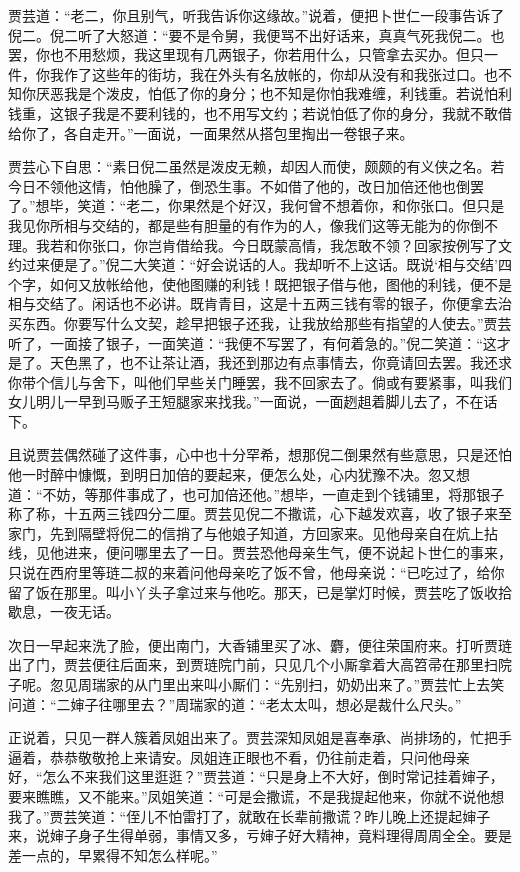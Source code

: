 \documentclass[12pt,oneside]{book}
\begin{document}
贾芸道：“老二，你且别气，听我告诉你这缘故。”说着，便把卜世仁一段事告诉了倪二。倪二听了大怒道：“要不是令舅，我便骂不出好话来，真真气死我倪二。也罢，你也不用愁烦，我这里现有几两银子，你若用什么，只管拿去买办。但只一件，你我作了这些年的街坊，我在外头有名放帐的，你却从没有和我张过口。也不知你厌恶我是个泼皮，怕低了你的身分；也不知是你怕我难缠，利钱重。若说怕利钱重，这银子我是不要利钱的，也不用写文约；若说怕低了你的身分，我就不敢借给你了，各自走开。”一面说，一面果然从搭包里掏出一卷银子来。

贾芸心下自思：“素日倪二虽然是泼皮无赖，却因人而使，颇颇的有义侠之名。若今日不领他这情，怕他臊了，倒恐生事。不如借了他的，改日加倍还他也倒罢了。”想毕，笑道：“老二，你果然是个好汉，我何曾不想着你，和你张口。但只是我见你所相与交结的，都是些有胆量的有作为的人，像我们这等无能为的你倒不理。我若和你张口，你岂肯借给我。今日既蒙高情，我怎敢不领？回家按例写了文约过来便是了。”倪二大笑道：“好会说话的人。我却听不上这话。既说‘相与交结’四个字，如何又放帐给他，使他图赚的利钱！既把银子借与他，图他的利钱，便不是相与交结了。闲话也不必讲。既肯青目，这是十五两三钱有零的银子，你便拿去治买东西。你要写什么文契，趁早把银子还我，让我放给那些有指望的人使去。”贾芸听了，一面接了银子，一面笑道：“我便不写罢了，有何着急的。”倪二笑道：“这才是了。天色黑了，也不让茶让酒，我还到那边有点事情去，你竟请回去罢。我还求你带个信儿与舍下，叫他们早些关门睡罢，我不回家去了。倘或有要紧事，叫我们女儿明儿一早到马贩子王短腿家来找我。”一面说，一面趔趄着脚儿去了，不在话下。

且说贾芸偶然碰了这件事，心中也十分罕希，想那倪二倒果然有些意思，只是还怕他一时醉中慷慨，到明日加倍的要起来，便怎么处，心内犹豫不决。忽又想道：“不妨，等那件事成了，也可加倍还他。”想毕，一直走到个钱铺里，将那银子称了称，十五两三钱四分二厘。贾芸见倪二不撒谎，心下越发欢喜，收了银子来至家门，先到隔壁将倪二的信捎了与他娘子知道，方回家来。见他母亲自在炕上拈线，见他进来，便问哪里去了一日。贾芸恐他母亲生气，便不说起卜世仁的事来，只说在西府里等琏二叔的来着问他母亲吃了饭不曾，他母亲说：“已吃过了，给你留了饭在那里。叫小丫头子拿过来与他吃。那天，已是掌灯时候，贾芸吃了饭收拾歇息，一夜无话。

次日一早起来洗了脸，便出南门，大香铺里买了冰、麝，便往荣国府来。打听贾琏出了门，贾芸便往后面来，到贾琏院门前，只见几个小厮拿着大高笤帚在那里扫院子呢。忽见周瑞家的从门里出来叫小厮们：“先别扫，奶奶出来了。”贾芸忙上去笑问道：“二婶子往哪里去？”周瑞家的道：“老太太叫，想必是裁什么尺头。”

正说着，只见一群人簇着凤姐出来了。贾芸深知凤姐是喜奉承、尚排场的，忙把手逼着，恭恭敬敬抢上来请安。凤姐连正眼也不看，仍往前走着，只问他母亲好，“怎么不来我们这里逛逛？”贾芸道：“只是身上不大好，倒时常记挂着婶子，要来瞧瞧，又不能来。”凤姐笑道：“可是会撒谎，不是我提起他来，你就不说他想我了。”贾芸笑道：“侄儿不怕雷打了，就敢在长辈前撒谎？昨儿晚上还提起婶子来，说婶子身子生得单弱，事情又多，亏婶子好大精神，竟料理得周周全全。要是差一点的，早累得不知怎么样呢。”
\end{document}
